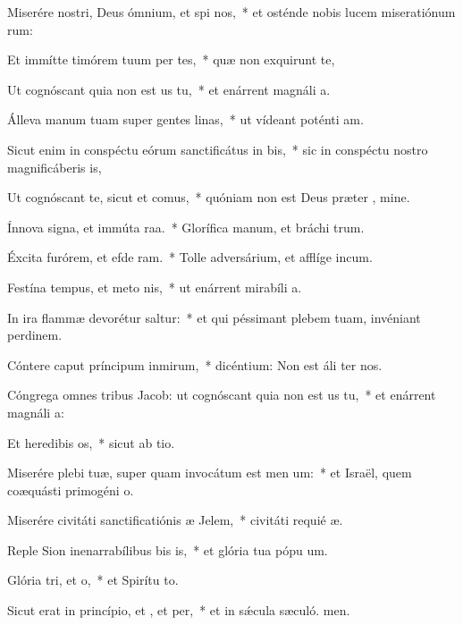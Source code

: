 \item Miserére nostri, Deus ómnium, et spi nos,~* et osténde nobis lucem miseratiónum rum:
\item Et immítte timórem tuum per tes,~* quæ non exquirunt te,
\item Ut cognóscant quia non est us  tu,~* et enárrent magnáli a.
\item Álleva manum tuam super gentes linas,~* ut vídeant poténti am.
\item Sicut enim in conspéctu eórum sanctificátus  in bis,~* sic in conspéctu nostro magnificáberis  is,
\item Ut cognóscant te, sicut et  comus,~* quóniam non est Deus præter , mine.
\item Ínnova signa, et immúta raa.~* Glorífica manum, et bráchi trum.
\item Éxcita furórem, et efde ram.~* Tolle adversárium, et afflíge incum.
\item Festína tempus, et meto nis,~* ut enárrent mirabíli a.
\item In ira flammæ devorétur  saltur:~* et qui péssimant plebem tuam, invéniant perdinem.
\item Cóntere caput príncipum inmirum,~* dicéntium: Non est áli ter nos.
\item Cóngrega omnes tribus Jacob: ut cognóscant quia non est us  tu,~* et enárrent magnáli a:
\item Et heredibis os,~* sicut ab tio.
\item Miserére plebi tuæ, super quam invocátum est men um:~* et Israël, quem coæquásti primogéni o.
\item Miserére civitáti sanctificatiónis æ Jelem,~* civitáti requié æ.
\item Reple Sion inenarrabílibus bis is,~* et glória tua pópu um.
\item Glória tri, et o,~* et Spirítu to.
\item Sicut erat in princípio, et , et per,~* et in sǽcula sæculó. men.
